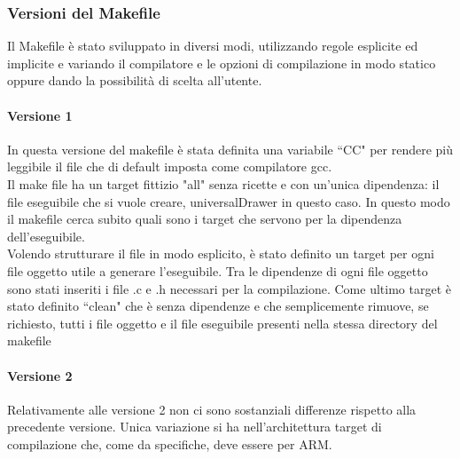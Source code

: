 \documentclass{article}
\begin{document}
	\subsubsection*{Versioni del Makefile}
		Il Makefile è stato sviluppato in diversi modi, utilizzando regole esplicite ed implicite e variando il compilatore
		e le opzioni di compilazione in modo statico oppure dando la possibilità di scelta all'utente.
		\paragraph*{Versione 1}
		In questa versione del makefile è stata definita una variabile ``CC" per rendere più leggibile il file che di default imposta come compilatore gcc. \\
		Il make file ha un target fittizio "all" senza ricette e con un'unica dipendenza: il file eseguibile che si vuole creare, universalDrawer in questo caso.
                In questo modo il makefile cerca subito quali sono i target che servono per la dipendenza dell'eseguibile. \\
		Volendo strutturare il file in modo esplicito, è stato definito un target per ogni file oggetto utile a generare l'eseguibile.
                Tra le dipendenze di ogni file oggetto sono stati inseriti i file .c e .h necessari per la compilazione.
		Come ultimo target è stato definito ``clean" che è senza dipendenze e che semplicemente rimuove, se richiesto, tutti i file oggetto e il file eseguibile presenti nella stessa directory del makefile 
		\paragraph*{Versione 2}
		Relativamente alle versione 2 non ci sono sostanziali differenze rispetto alla precedente versione. Unica variazione si ha nell'architettura target di compilazione che, come da specifiche, deve essere per ARM.
\end{document}
